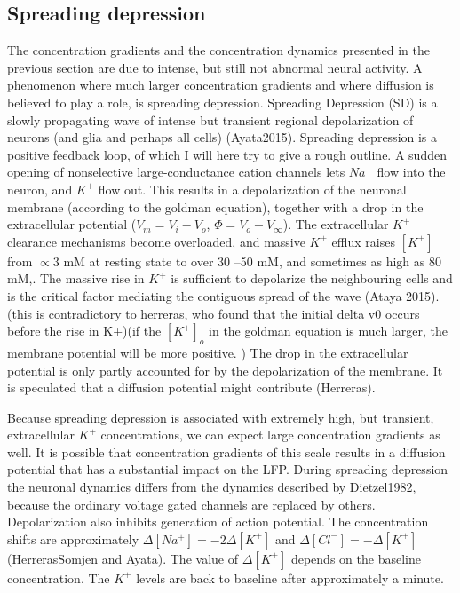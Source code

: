 \documentclass{article}
\begin{document}
\subsection{Spreading depression}
The concentration gradients and the concentration dynamics presented in the previous section are due to intense, but still not abnormal neural activity. A phenomenon where much larger concentration gradients and where diffusion is believed to play a role, is spreading depression. Spreading Depression (SD) is a slowly propagating wave of intense but transient
regional depolarization of neurons (and glia and perhaps all cells) (Ayata2015). Spreading depression is a positive feedback loop, of which I will here try to give a rough outline. A sudden opening of nonselective large-conductance cation channels lets $Na^+$ flow into the neuron, and $K^+$ flow out. This results in a depolarization of the neuronal membrane (according to the goldman equation), together with a drop in the extracellular potential ($V_m=V_i-V_o$, $\Phi = V_o - V_{\infty}$). The extracellular $K^+$ clearance mechanisms become overloaded, and massive $K^+$ efflux raises $[K^+]$ from $ \propto 3$ mM at resting state
to over 30 –50 mM, and sometimes as
high as 80 mM,. The massive rise in $K^+$ is sufficient to depolarize the neighbouring cells and is the critical factor mediating the contiguous spread of
the wave (Ataya 2015). (this is contradictory to herreras, who found that the initial delta v0 occurs before the rise in K+)(if the $[K^+]_o$ in the goldman equation is much larger, the membrane potential will be more positive. )
The drop in the extracellular potential is only partly accounted for by the depolarization of the membrane. It is speculated that a diffusion potential might contribute (Herreras). 


Because spreading depression is associated with extremely high, but transient, extracellular $K^+$ concentrations, we can expect large concentration gradients as well. It is possible that concentration gradients of this scale results in a diffusion potential that has a substantial impact on the LFP. During spreading depression the neuronal dynamics differs from the dynamics described by Dietzel1982, because the ordinary voltage gated channels are replaced by others. Depolarization also inhibits generation of action potential. The concentration shifts are approximately $\Delta [Na^+] = -2\Delta [K^+]$ and $\Delta [Cl^-] = -\Delta[K^+]$(HerrerasSomjen  and Ayata). The value of $\Delta [K^+]$ depends on the baseline concentration. The $K^+$ levels are back to baseline after approximately a minute. 
\end{document}
